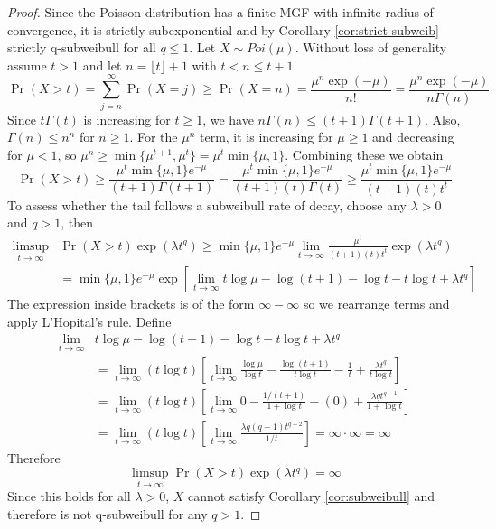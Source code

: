 \documentclass{article}
\theoremstyle{definition}
\begin{document}
\begin{proof}
Since the Poisson distribution has a finite MGF with infinite radius of convergence, it is strictly subexponential and by Corollary \ref{cor:strict-subweib} strictly q-subweibull for all $q\leq 1$. Let $X\sim Poi(\mu)$. Without loss of generality assume $t>1$ and let $n=\lfloor t\rfloor +1$ with $t<n\leq t+1$. 
\[\Pr(X>t) = \sum_{j=n}^\infty \Pr(X=j) \geq \Pr(X=n)=\frac{\mu^{n}\exp(-\mu)}{n!} = \frac{\mu^{n}\exp(-\mu)}{n\Gamma(n)}\]
Since $t\Gamma(t)$ is increasing for $t\geq 1$, we have $n\Gamma(n)\leq (t+1)\Gamma(t+1)$. Also, $\Gamma(n)\leq n^n$ for $n\geq 1$. For the $\mu^n$ term, it is increasing for $\mu\geq 1$ and decreasing for $\mu<1$, so $\mu^n\geq \min\{\mu^{t+1},\mu^t\}=\mu^t\min\{\mu,1\}$. Combining these we obtain
\[\Pr(X>t)\geq \frac{\mu^t\min\{\mu,1\}e^{-\mu}}{(t+1)\Gamma(t+1)} = \frac{\mu^t \min\{\mu,1\}e^{-\mu}}{(t+1)(t)\Gamma(t)}\geq \frac{\mu^t \min\{\mu,1\}e^{-\mu}}{(t+1)(t)t^t}\]
To assess whether the tail follows a subweibull rate of decay, choose any $\lambda>0$ and $q>1$, then
\begin{align*}
\limsup_{t\to\infty}& \Pr(X>t)\exp(\lambda t^q)\geq \min\{\mu,1\}e^{-\mu}\lim_{t\to\infty}\frac{\mu^t}{(t+1)(t)t^t}\exp(\lambda t^q)\\
&= \min\{\mu,1\}e^{-\mu}\exp\left[\lim_{t\to\infty}t\log\mu-\log(t+1)-\log t-t\log t+\lambda t^q\right]
\end{align*}
The expression inside brackets is of the form $\infty-\infty$ so we rearrange terms and apply L'Hopital's rule. Define
\begin{align*}
\lim_{t\to\infty}&t\log\mu-\log(t+1)-\log t-t\log t+\lambda t^q\\
&= \lim_{t\to\infty} (t\log t)\left[\lim_{t\to\infty}\frac{\log\mu}{\log t} - \frac{\log(t+1)}{t\log t}-\frac{1}{t}+\frac{\lambda t^q}{t\log t}\right]\\
&= \lim_{t\to\infty} (t\log t)\left[\lim_{t\to\infty}0 - \frac{1/(t+1)}{1+\log t}-(0)+\frac{\lambda qt^{q-1}}{1+\log t}\right]\\
&= \lim_{t\to\infty} (t\log t)\left[\lim_{t\to\infty}\frac{\lambda q(q-1)t^{q-2}}{1/t}\right] = \infty \cdot \infty = \infty
\end{align*}
Therefore
\[\limsup_{t\to\infty} \Pr(X>t)\exp(\lambda t^q)= \infty\]
Since this holds for all $\lambda>0$, $X$ cannot satisfy Corollary \ref{cor:subweibull} and therefore is not q-subweibull for any $q>1$.
\end{proof}
\end{document}
